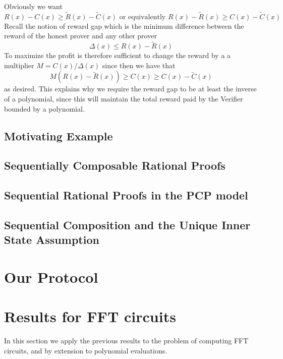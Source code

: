 Obviously we want
\[ R(x)-C(x) \geq \tilde{R}(x)-\tilde{C}(x) \mbox{ or equivalently } 
R(x)-\tilde{R}(x) \geq C(x) - \tilde{C}(x) \]
Recall the notion of reward gap which is the minimum difference between the reward of the honest prover and any other prover
\[ \Delta(x) \leq R(x)-\tilde{R}(x) \]
To maximize the profit is therefore sufficient to change the reward by a 
a multiplier $M= C(x)/\Delta(x)$ since then we have that 
\[ M(R(x) - \tilde{R}(x)) \geq C(x) \geq C(x) - \tilde{C}(x) \]
as desired. This explains why we require the reward gap to be at least the inverse of a polynomial, since this will maintain the total reward paid by the Verifier bounded by a polynomial. 




\subsection{Motivating Example}


\subsection{Sequentially Composable Rational Proofs}


\subsection{Sequential Rational Proofs in the PCP model}


\subsection{Sequential Composition and the Unique Inner State Assumption}
\label{sec:uisa}


\section{Our Protocol}


\section{Results for FFT circuits}

In this section we apply the previous results to the problem of computing FFT circuits, and by extension to polynomial evaluations. 


